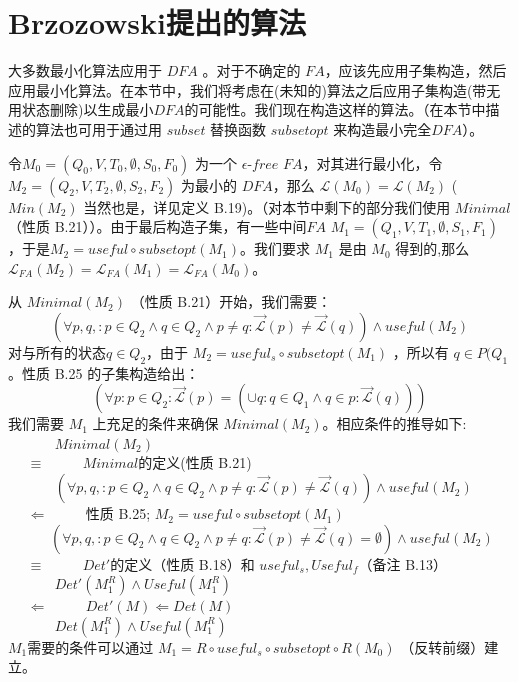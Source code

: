 \chapter{Brzozowski提出的算法}

大多数最小化算法应用于 $DFA$ 。对于不确定的 $FA$，应该先应用子集构造，然后应用最小化算法。在本节中，我们将考虑在(未知的)算法之后应用子集构造(带无用状态删除)以生成最小$DFA$的可能性。我们现在构造这样的算法。（在本节中描述的算法也可用于通过用 $subset$ 替换函数 $subsetopt$ 来构造最小完全$DFA$）。

令$M_0 = (Q_0,V,T_0,\emptyset ,S_0,F_0)$ 为一个 $\epsilon$-$free$ $FA$，对其进行最小化，令 $M_2 = ( Q_2,V,T_2,\emptyset,S_2,F_2 ) $ 为最小的 $DFA$，那么 $ \mathcal{L} (M_0) = \mathcal{L}(M_2) $ ( $Min(M_2)$ 当然也是，详见定义 B.19)。（对本节中剩下的部分我们使用 $Minimal$（性质 B.21））。由于最后构造子集，有一些中间$FA$ $M_1 = ( Q_1,V,T_1,\emptyset,S_1,F_1 )$，于是$M_2 = useful \circ subsetopt(M_1)$。我们要求 $M_1$ 是由 $M_0$ 得到的,那么 $ \mathcal{L}_{FA}(M_2) = \mathcal{L}_{FA}(M_1) = \mathcal{L}_{FA}(M_0)$。

从 $Minimal(M_2)$  （性质 B.21）开始，我们需要：
$$ (\forall p,q,:p\in Q_2 \land q \in Q_2 \land p \not= q : \overrightarrow{\mathcal{L}}(p) \not= \overrightarrow{\mathcal{L}}(q)) \land useful(M_2)   $$ 
对与所有的状态$q\in Q_2$，由于 $M_2 = useful_s \circ subsetopt(M_1)$ ，所以有 $q\in P(Q_1$ 。性质 B.25 的子集构造给出： 
$$ (\forall p:p\in Q_2 : \overrightarrow{\mathcal{L}}(p) = (\cup q:q \in Q_1 \land q \in p:\overrightarrow{\mathcal{L}}(q)) ) $$ 
我们需要 $M_1$ 上充足的条件来确保 $Minimal(M_2)$。相应条件的推导如下: \\
\mbox{　　　} $Minimal(M_2)$ \\
\mbox{　} $\equiv$ \mbox{　　} {$Minimal$的定义(性质 B.21)} \\
\mbox{　　　} $ (\forall p,q,:p\in Q_2 \land q \in Q_2 \land p \not= q : \overrightarrow{\mathcal{L}}(p) \not= \overrightarrow{\mathcal{L}}(q)) \land useful(M_2)$ \\
\mbox{　} $ \Leftarrow $ \mbox{　　} { 性质 B.25; $M_2 = useful \circ subsetopt(M_1)$ } \\
\mbox{　　　}$ (\forall p,q,:p\in Q_2 \land q \in Q_2 \land p \not= q : \overrightarrow{\mathcal{L}}(p) \not= \overrightarrow{\mathcal{L}}(q) = \emptyset) \land useful(M_2)$ \\
\mbox{　} $\equiv $ \mbox{　　} {$Det'$的定义（性质 B.18）和 $useful_s, Useful_f $（备注 B.13） } \\
\mbox{　　　} $Det'(M^R_1) \land Useful(M^R_1)$ \\
\mbox{　} $\Leftarrow $ \mbox{　　} {$Det'(M) \Leftarrow Det(M)$} \\
\mbox{　　　} $Det(M^R_1) \land Useful(M^R_1)$ \\
$M_1$需要的条件可以通过 $M_1=R \circ useful_s \circ subsetopt \circ R(M_0)$ （反转前缀）建立。

